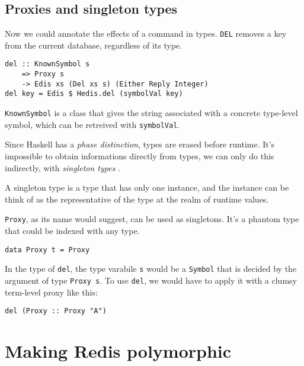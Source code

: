 \documentclass[pldi]{sigplanconf-pldi16}
\begin{document}
\subsection{Proxies and singleton types}

Now we could annotate the effects of a command in types.
\texttt{DEL} removes a key from the current database,
regardless of its type.

\begin{verbatim}
del :: KnownSymbol s
    => Proxy s
    -> Edis xs (Del xs s) (Either Reply Integer)
del key = Edis $ Hedis.del (symbolVal key)
\end{verbatim}

\texttt{KnownSymbol} is a class that gives the string associated
with a concrete type-level symbol, which can be retreived with
\texttt{symbolVal}.\footnotemark


Since Haskell has a \emph{phase distinction}\cite{phasedistinction}, types are
erased before runtime. It's impossible to obtain informations directly from
types, we can only do this indirectly, with \emph{singleton types}
\cite{singletons}.

A singleton type is a type that has only one instance, and the instance can be
think of as the representative of the type at the realm of runtime values.

\texttt{Proxy}, as its name would suggest, can be used as
singletons. It's a phantom type that could be indexed with any type.

\begin{verbatim}
data Proxy t = Proxy
\end{verbatim}

In the type of \texttt{del}, the type varabile
\texttt{s} would be a \texttt{Symbol} that is decided
 by the argument of type \texttt{Proxy s}.
To use \texttt{del}, we would have to apply it with a clumsy
 term-level proxy like this:

\begin{verbatim}
del (Proxy :: Proxy "A")
\end{verbatim}

\section{Making Redis polymorphic}
\end{document}
